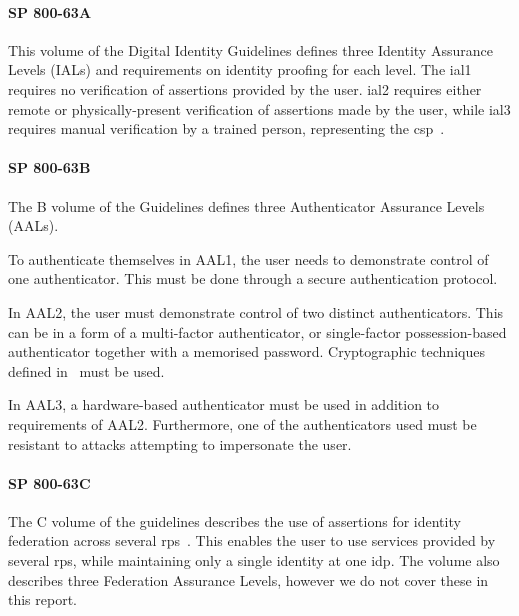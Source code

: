 \paragraph{SP 800-63A}
This volume of the Digital Identity Guidelines defines three Identity Assurance Levels (IALs) and requirements on identity proofing for each level. The \acrshort{ial}1 requires no verification of assertions provided by the user. \acrshort{ial}2 requires either remote or physically-present verification of assertions made by the user, while \acrshort{ial}3 requires manual verification by a trained person, representing the \acrshort{csp}~\cite{Grassi2017DigitalProofing}.

\paragraph{SP 800-63B}
The B volume of the Guidelines defines three Authenticator Assurance Levels (AALs).

To authenticate themselves in AAL1, the user needs to demonstrate control of one authenticator. This must be done through a secure authentication protocol.

In AAL2, the user must demonstrate control of two distinct authenticators. This can be in a form of a multi-factor authenticator, or single-factor possession-based authenticator together with a memorised password. Cryptographic techniques defined in~\cite{Evans2001SECURITYMODULES} must be used.

In AAL3, a hardware-based authenticator must be used in addition to requirements of AAL2. Furthermore, one of the authenticators used must be resistant to attacks attempting to impersonate the user.

\paragraph{SP 800-63C}
The C volume of the guidelines describes the use of assertions for identity federation across several \acrshort{rp}s~\cite{Grassi2017DigitalAssertions}. This enables the user to use services provided by several \acrshort{rp}s, while maintaining only a single identity at one \acrshort{idp}. The volume also describes three Federation Assurance Levels, however we do not cover these in this report.